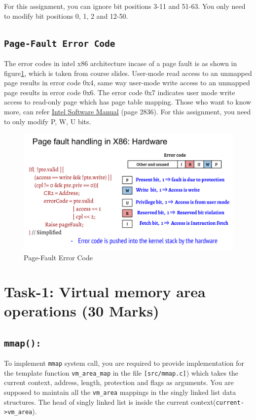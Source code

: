 \documentclass[12pt]{article}
\begin{document}
For this assignment, you can ignore bit positions 3-11 and 51-63. You only need to modify bit positions 0, 1, 2 and 12-50.

\subsection*{\tt Page-Fault Error Code}
The error codes in intel x86 architecture incase of a page fault is as shown in figure\ref{fig:pagefault}, which is taken from course slides. User-mode read access to an unmapped page results in error code 0x4, same way user-mode write access to an unmapped page results in error code 0x6. The error code 0x7 indicates user mode write access to read-only page which has page table mapping. Those who want to know more, can refer \href{https://software.intel.com/sites/default/files/managed/39/c5/325462-sdm-vol-1-2abcd-3abcd.pdf}{Intel Software Manual} (page 2836).
For this assignment, you need to only modify P, W, U bits.
\begin{figure}[H]
    \centering
    \includegraphics[scale=.25]{Errors.png}
    \caption{Page-Fault Error Code}
    \label{fig:pagefault}
\end{figure}


\newpage
\section*{Task-1: Virtual memory area operations (30 Marks)}


\subsection*{\tt mmap():}
    To implement {\tt mmap} system call, you are required to provide implementation for the template function {\tt vm\_area\_map} in the file {\tt [src/mmap.c]}) which takes the current context, address, length, protection and flags as arguments. You are supposed to maintain all the {\tt vm\_area} mappings in the singly linked list data structures. The head of singly linked list is inside the current context({\tt current->vm\_area}).
    
\end{document}
